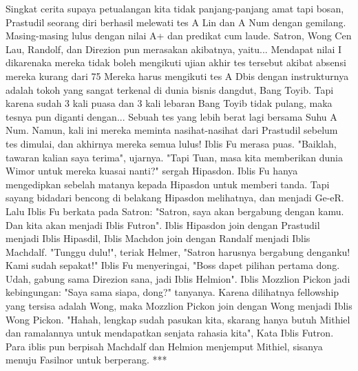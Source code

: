 \documentclass[a4paper,11pt,final]{article}
\begin{document}
Singkat cerita supaya petualangan kita tidak panjang-panjang amat tapi bosan, Prastudil seorang diri berhasil melewati tes A Lin dan A Num dengan gemilang. Masing-masing lulus dengan nilai A+ dan predikat cum laude.
Satron, Wong Cen Lau, Randolf, dan Direzion pun merasakan akibatnya, yaitu...
Mendapat nilai I dikarenaka mereka tidak boleh mengikuti ujian akhir tes tersebut akibat absensi mereka kurang dari 75%
Mereka harus mengikuti tes A Dbis dengan instrukturnya adalah tokoh yang sangat terkenal di dunia bisnis dangdut, Bang Toyib. Tapi karena sudah 3 kali puasa dan 3 kali lebaran Bang Toyib tidak pulang, maka tesnya pun diganti dengan...
Sebuah tes yang lebih berat lagi bersama Suhu A Num. Namun, kali ini mereka meminta nasihat-nasihat dari Prastudil sebelum tes dimulai, dan akhirnya mereka semua lulus! Iblis Fu merasa puas. "Baiklah, tawaran kalian saya terima", ujarnya.
"Tapi Tuan, masa kita memberikan dunia Wimor untuk mereka kuasai nanti?" sergah Hipasdon. Iblis Fu hanya mengedipkan sebelah matanya kepada Hipasdon untuk memberi tanda. Tapi sayang bidadari bencong di belakang Hipasdon melihatnya, dan menjadi Ge-eR.
Lalu Iblis Fu berkata pada Satron: "Satron, saya akan bergabung dengan kamu. Dan kita akan menjadi Iblis Futron". Iblis Hipasdon join dengan Prastudil menjadi Iblis Hipasdil, Iblis Machdon join dengan Randalf menjadi Iblis Machdalf.
"Tunggu dulu!", teriak Helmer, "Satron harusnya bergabung denganku! Kami sudah sepakat!" Iblis Fu menyeringai, "Boss dapet pilihan pertama dong. Udah, gabung sama Direzion sana, jadi Iblis Helmion".
Iblis Mozzlion Pickon jadi kebingungan: "Saya sama siapa, dong?" tanyanya. Karena dilihatnya fellowship yang tersisa adalah Wong, maka Mozzlion Pickon join dengan Wong menjadi Iblis Wong Pickon.
"Hahah, lengkap sudah pasukan kita, skarang hanya butuh Mithiel dan ramalannya untuk mendapatkan senjata rahasia kita", Kata Iblis Futron. Para iblis pun berpisah Machdalf dan Helmion menjemput Mithiel, sisanya menuju Fasilnor untuk berperang.
***
\end{document}
